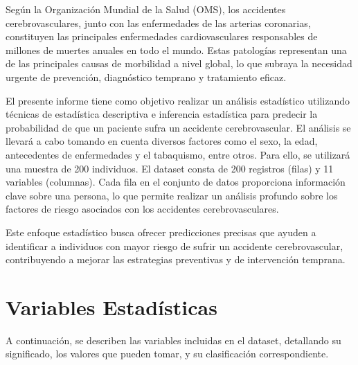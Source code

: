 \documentclass[a4paper, 12pt]{article}
\begin{document}
Según la Organización Mundial de la Salud (OMS), los accidentes cerebrovasculares, junto con las enfermedades de las arterias coronarias, constituyen las principales enfermedades cardiovasculares responsables de millones de muertes anuales en todo el mundo. Estas patologías representan una de las principales causas de morbilidad a nivel global, lo que subraya la necesidad urgente de prevención, diagnóstico temprano y tratamiento eficaz.

El presente informe tiene como objetivo realizar un análisis estadístico utilizando técnicas de estadística descriptiva e inferencia estadística para predecir la probabilidad de que un paciente sufra un accidente cerebrovascular. El análisis se llevará a cabo tomando en cuenta diversos factores como el sexo, la edad, antecedentes de enfermedades y el tabaquismo, entre otros. Para ello, se utilizará una muestra de 200 individuos. El dataset consta de 200 registros (filas) y 11 variables (columnas). Cada fila en el conjunto de datos proporciona información clave sobre una persona, lo que permite realizar un análisis profundo sobre los factores de riesgo asociados con los accidentes cerebrovasculares.

Este enfoque estadístico busca ofrecer predicciones precisas que ayuden a identificar a individuos con mayor riesgo de sufrir un accidente cerebrovascular, contribuyendo a mejorar las estrategias preventivas y de intervención temprana.

\newpage
\section{Variables Estadísticas}
A continuación, se describen las variables incluidas en el dataset, detallando su significado, los valores que pueden tomar, y su clasificación correspondiente.
\end{document}
